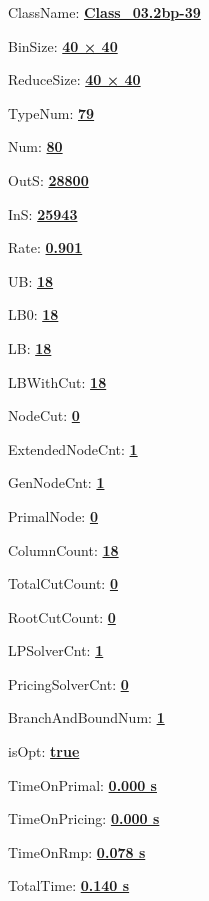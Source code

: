 \documentclass[11pt]{article}
\begin{document}
\pagestyle{empty}


ClassName: \underline{\textbf{Class_03.2bp-39}}
\par
BinSize: \underline{\textbf{40 × 40}}
\par
ReduceSize: \underline{\textbf{40 × 40}}
\par
TypeNum: \underline{\textbf{79}}
\par
Num: \underline{\textbf{80}}
\par
OutS: \underline{\textbf{28800}}
\par
InS: \underline{\textbf{25943}}
\par
Rate: \underline{\textbf{0.901}}
\par
UB: \underline{\textbf{18}}
\par
LB0: \underline{\textbf{18}}
\par
LB: \underline{\textbf{18}}
\par
LBWithCut: \underline{\textbf{18}}
\par
NodeCut: \underline{\textbf{0}}
\par
ExtendedNodeCnt: \underline{\textbf{1}}
\par
GenNodeCnt: \underline{\textbf{1}}
\par
PrimalNode: \underline{\textbf{0}}
\par
ColumnCount: \underline{\textbf{18}}
\par
TotalCutCount: \underline{\textbf{0}}
\par
RootCutCount: \underline{\textbf{0}}
\par
LPSolverCnt: \underline{\textbf{1}}
\par
PricingSolverCnt: \underline{\textbf{0}}
\par
BranchAndBoundNum: \underline{\textbf{1}}
\par
isOpt: \underline{\textbf{true}}
\par
TimeOnPrimal: \underline{\textbf{0.000 s}}
\par
TimeOnPricing: \underline{\textbf{0.000 s}}
\par
TimeOnRmp: \underline{\textbf{0.078 s}}
\par
TotalTime: \underline{\textbf{0.140 s}}
\par
\newpage


\end{document}
